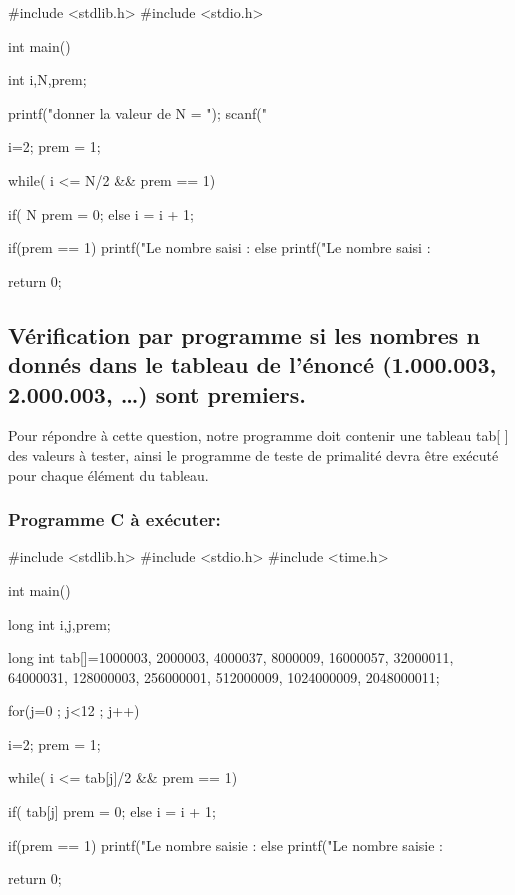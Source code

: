 \documentclass[12pt]{article}
\begin{document}
\begin{sql}
#include <stdlib.h>
#include <stdio.h>

int main()
{

	int i,N,prem;

	printf("donner la valeur de N = ");
	scanf("%

	i=2;
	prem = 1;

	while( i <= N/2 && prem == 1){

		if( N%
			prem = 0;
		else
			i = i + 1;
	}

	if(prem == 1)
    {
        printf("Le nombre saisi : %
    }
	else{
        printf("Le nombre saisi : %
	}

return 0;
}
\end{sql}



\subsection{Vérification par programme  si  les  nombres  n  donnés  dans  le tableau de l'énoncé (1.000.003, 2.000.003, …) sont premiers.}

Pour répondre à cette question, notre programme doit contenir une tableau tab[ ] des valeurs à tester, ainsi le programme de teste de primalité devra être exécuté pour chaque élément du tableau.

\subsubsection{Programme C à exécuter:}

\begin{sql}
#include <stdlib.h>
#include <stdio.h>
#include <time.h>

int main()
{
	long int i,j,prem;

	long int tab[]={1000003, 2000003, 4000037, 8000009, 16000057, 32000011, 64000031, 128000003, 256000001, 512000009,	1024000009,	2048000011};

for(j=0 ; j<12 ; j++)
{
	i=2;
	prem = 1;
	
	while( i <= tab[j]/2 && prem == 1){

		if( tab[j]%
			prem = 0;
		else
			i = i + 1;
	}

	if(prem == 1)
    {
        printf("Le nombre saisie : %
    }
	else{
        printf("Le nombre saisie : %
	}
}

return 0;
}
\end{sql}
\end{document}
